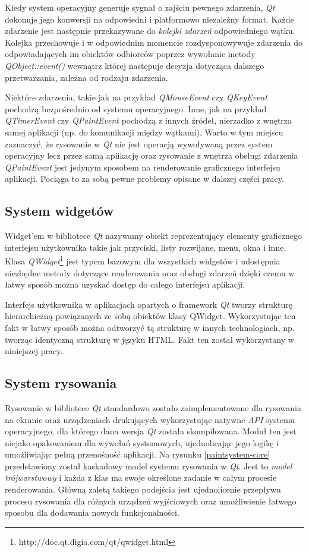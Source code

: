 Kiedy system operacyjny generuje sygnał o zajściu pewnego zdarzenia, \emph{Qt} dokonuje jego konwersji na odpowiedni i platformowo niezależny format. Każde zdarzenie jest następnie przekazywane do \emph{kolejki zdarzeń} odpowiedniego wątku. Kolejka przechowuje i w odpowiednim momencie rozdysponowywuje zdarzenia do odpowiadających im obiektów odbiorców poprzez wywołanie metody \emph{QObject::event()} wewnątrz której następuje decyzja dotycząca dalszego przetwarzania, zależna od rodzaju zdarzenia. 

Niektóre zdarzenia, takie jak na przykład \emph{QMouseEvent} czy \emph{QKeyEvent} pochodzą bezpośrednio od systemu operacyjnego. Inne, jak na przykład \emph{QTimerEvent} czy \emph{QPaintEvent} pochodzą z innych źródeł, nierzadko z wnętrza samej aplikacji (np. do komunikacji między wątkami). Warto w tym miejscu zaznaczyć, że rysowanie w \emph{Qt} nie jest operacją wywoływaną przez system operacyjny lecz przez samą aplikację oraz rysowanie z wnętrza obsługi zdarzenia \emph{QPaintEvent} jest jedynym sposobem na renderowanie graficznego interfejsu aplikacji. Pociąga to za sobą pewne problemy opisane w dalszej części pracy.

\subsection{System widgetów}
Widget'em w bibliotece \emph{Qt} nazywamy obiekt reprezentujący elementy graficznego interfejsu użytkownika takie jak przyciski, listy rozwijane, menu, okna i inne. Klasa \emph{QWidget}\footnote{http://doc.qt.digia.com/qt/qwidget.html} jest typem bazowym dla wszystkich widgetów i udostępnia niezbędne metody dotyczące renderowania oraz obsługi zdarzeń dzięki czemu w łatwy sposób można uzyskać dostęp do całego interfejsu aplikacji.

Interfejs użytkownika w aplikacjach opartych o framework \emph{Qt} tworzy strukturę hierarchiczną powiązanych ze sobą obiektów klasy QWidget. Wykorzystując ten fakt w łatwy sposób można odtworzyć tą strukturę w innych technologiach, np. tworząc identyczną strukturę w języku HTML. Fakt ten został wykorzystany w niniejszej pracy.

\subsection{System rysowania}
\label{system_rysowania}
Rysowanie w bibliotece \emph{Qt} standardowo zostało zaimplementowane dla rysowania na ekranie oraz urządzeniach drukujących wykorzystując natywne \emph{API} systemu operacyjnego, dla którego dana wersja \emph{Qt} została skompilowana. Moduł ten jest niejako opakowaniem dla wywołań systemowych, ujednolicając jego logikę i umożliwiając pełną przenośność aplikacji. Na rysunku \ref{paintsystem-core} przedstawiony został kaskadowy model systemu rysowania w \emph{Qt}. Jest to \emph{model trójwarstwowy} i każda z klas ma swoje określone zadanie w całym procesie renderowania. Główną zaletą takiego podejścia jest ujednolicenie przepływu procesu rysowania dla różnych urządzeń wyjściowych oraz umożliwienie łatwego sposobu dla dodawania nowych funkcjonalności.

